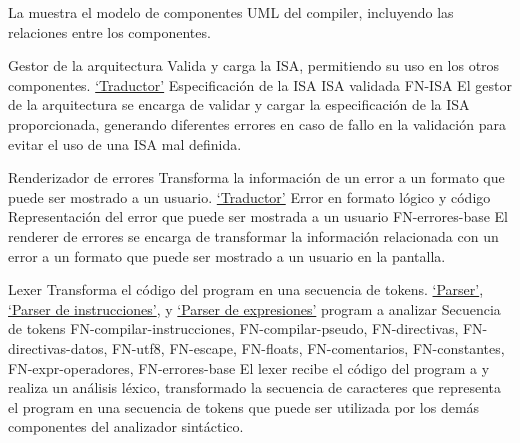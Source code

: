 La  muestra el modelo de componentes UML
\parencite{UMLSpec} del \gls{compiler}, incluyendo las relaciones entre los
componentes.


\printcomptemplate

\newcommand{\componentref}[1]{\hyperref[req:#1]{`#1'}}

\begin{component}{Gestor de la arquitectura}
    {Valida y carga la \gls{ISA}, permitiendo su uso en los otros componentes.} %
    {\componentref{Traductor}} %
    {Especificación de la \gls{ISA}} %
    {\gls{ISA} validada} %
    {FN-ISA} %
    El gestor de la arquitectura se encarga de validar y cargar la
    especificación de la \gls{ISA} proporcionada, generando diferentes errores
    en caso de fallo en la validación para evitar el uso de una \gls{ISA} mal
    definida.
\end{component}

\begin{component}{Renderizador de errores}
    {Transforma la información de un error a un formato que puede ser mostrado a un usuario.} %
    {\componentref{Traductor}} %
    {Error en formato lógico y código } %
    {Representación del error que puede ser mostrada a un usuario} %
    {FN-errores-base} %
    El \gls{renderer} de errores se encarga de transformar la información
    relacionada con un error a un formato que puede ser mostrado a un usuario en
    la pantalla.
\end{component}

\begin{component}{Lexer}
    {Transforma el código del \gls{program} en una secuencia de \glspl{token}.} %
    {\componentref{Parser}, \componentref{Parser de instrucciones}, y \componentref{Parser de expresiones}} %
    {\Gls{program} a analizar} %
    {Secuencia de \glspl{token}} %
    {FN-compilar-instrucciones, FN-compilar-pseudo, FN-directivas, FN-directivas-datos, FN-utf8, FN-escape, FN-floats, FN-comentarios, FN-constantes, FN-expr-operadores, FN-errores-base} %
    El lexer recibe el código del \gls{program} a
     y realiza un análisis léxico, transformado
    la secuencia de caracteres que representa el \gls{program} en una secuencia
    de \glspl{token} que puede ser utilizada por los demás componentes del
    analizador sintáctico.
\end{component}

